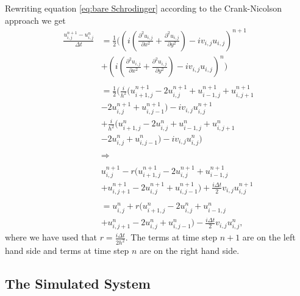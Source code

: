 \documentclass[english,notitlepage,reprint,nofootinbib]{revtex4-2}  %
\begin{document}
	\noindent
	Rewriting equation \ref{eq:bare Schrodinger}
	according to the Crank-Nicolson approach we get 
	\begin{equation}\label{eq:algo}
		\begin{aligned}
		\frac{u^{n+1}_{i,j}-u^{n}_{i,j}}{\Delta t} &=  \frac{1}{2}\Big(\left(i\left(\frac{\partial^2 u_{i,j}}{\partial x^2} + \frac{\partial^2 u_{i,j}}{\partial y^2}\right) -i v_{i,j} u_{i,j}\right)^{n+1} \\
	    &+   \left(i(\frac{\partial^2 u_{i,j}}{\partial x^2} + \frac{\partial^2 u_{i,j}}{\partial y^2}) -i v_{i,j} u_{i,j}\right)^{n} \Big)\\
	    &\ \\
		&=  \frac{1}{2}\Big(    \frac{i}{h^2}\big(  u^{n+1}_{i+1,j}-2u^{n+1}_{i,j}+u^{n+1}_{i-1,j}   +u^{n+1}_{i,j+1}\\
		&-2u^{n+1}_{i,j}+u^{n+1}_{i,j-1}\big)-iv_{i,j}u^{n+1}_{i,j}\\
		&+ \frac{i}{h^2}\big(  u^{n}_{i+1,j}-2u^{n}_{i,j}+u^{n}_{i-1,j}   +u^{n}_{i,j+1}\\
		&-2u^{n}_{i,j}+u^{n}_{i,j-1}\big)-iv_{i,j}u^{n}_{i,j}      \Big)\\ 
		&\ \\
		&\Rightarrow \\ 
		&\ \\
		&u^{n+1}_{i,j} -r\Big(  u^{n+1}_{i+1,j}-2u^{n+1}_{i,j}+u^{n+1}_{i-1,j} \\
		&+u^{n+1}_{i,j+1}-2u^{n+1}_{i,j}+u^{n+1}_{i,j-1}\Big) +\frac{i\Delta t}{2}v_{i,j}u^{n+1}_{i,j}\\
		&\ \\
		&= u^n_{i,j}+ r\Big(  u^{n}_{i+1,j}-2u^{n}_{i,j}+u^{n}_{i-1,j}\\
		&+u^{n}_{i,j+1}-2u^{n}_{i,j}+u^{n}_{i,j-1}\Big)-\frac{i\Delta t}{2}v_{i,j}u^{n}_{i,j},
		\end{aligned}
	\end{equation}
	\noindent
	where we have used that $r = \frac{i\Delta t}{2h^2}$. The terms at time
	step $n+1$ are on the left hand side and terms at time step $n$ are on the right
	hand side.\\
	

	\subsection{The Simulated System}
\end{document}

